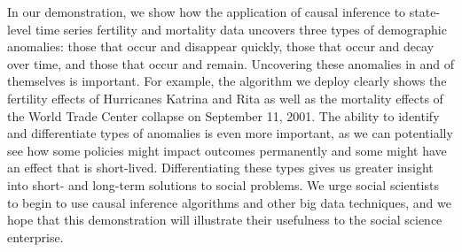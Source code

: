 \documentclass[12pt]{article}
\begin{document}
In our demonstration, we show how the application of causal inference to
state-level time series fertility and mortality data uncovers three
types of demographic anomalies: those that occur and disappear quickly,
those that occur and decay over time, and those that occur and remain.
Uncovering these anomalies in and of themselves is important. For
example, the algorithm we deploy clearly shows the fertility effects of
Hurricanes Katrina and Rita as well as the mortality effects of the
World Trade Center collapse on September 11, 2001. The ability to
identify and differentiate types of anomalies is even more important, as
we can potentially see how some policies might impact outcomes
permanently and some might have an effect that is short-lived.
Differentiating these types gives us greater insight into short- and
long-term solutions to social problems. We urge social scientists to
begin to use causal inference algorithms and other big data techniques,
and we hope that this demonstration will illustrate their usefulness to
the social science enterprise.

\newpage



\end{document}
